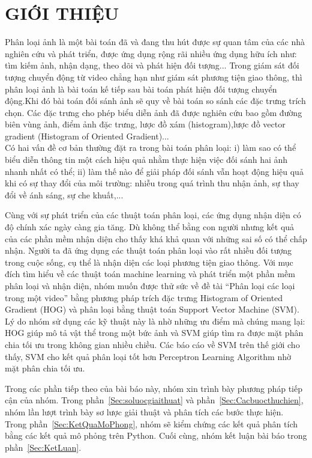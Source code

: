 \documentclass[10pt,conference,a4paper]{IEEEtran}
\begin{document}
\section{GIỚI THIỆU}
%
Phân loại ảnh là một bài toán đã và đang thu hút được sự quan tâm của các nhà nghiên cứu và phát triển, được ứng dụng rộng rãi nhiều ứng dụng hữu ích như: tìm kiếm ảnh, nhận dạng, theo dõi và phát hiện đối tượng... Trong giám sát đối tượng chuyển động từ video chẳng hạn như giám sát phương tiện giao thông, thì phân loại ảnh là bài toán kế tiếp sau bài toán phát hiện đối tượng chuyển động.Khi đó bài toán đối sánh ảnh sẽ quy về bài toán so sánh các đặc trưng trích chọn. Các đặc trưng cho phép biểu diễn ảnh đã được nghiên cứu bao gồm đường biên vùng ảnh, điểm ảnh đặc trưng, lược đồ xám (histogram),lược đồ vector gradient (Histogram of Oriented Gradient)... \\
Có hai vấn đề cơ bản thường đặt ra trong bài toán phân loại: i) làm sao có thể biểu diễn thông tin một cách hiệu quả nhằm thực hiện việc đối sánh hai ảnh nhanh nhất có thể; ii) làm thế nào để giải pháp đối sánh vẫn hoạt động hiệu quả khi có sự thay đổi của môi trường: nhiễu trong quá trình thu nhận ảnh, sự thay đổi về ánh sáng, sự che khuất,...


Cùng với sự phát triển của các thuật toán phân loại, các ứng dụng nhận diện có độ chính xác ngày càng gia tăng. Dù không thể bằng con người nhưng kết quả của các phần mềm nhận diện cho thấy khá khả quan với những sai số có thể chấp nhận. Người ta đã ứng dụng các thuật toán phân loại vào rất nhiều đối tượng trong cuộc sống, cụ thể là nhận diện các loại phương tiện giao thông. Với mục đích tìm hiểu về các thuật toán machine learning và phát triển một phần mềm phân loại và nhận diện, nhóm muốn được thử sức về đề tài “Phân loại các loại trong một video” bằng phương pháp trích đặc trưng Histogram of Oriented Gradient (HOG) và phân loại bằng thuật toán Support Vector Machine (SVM). Lý do nhóm sử dụng các kỹ thuật này là nhờ những ưu điểm mà chúng mang lại: HOG giúp mô tả vật thể trong một bức ảnh và SVM giúp tìm ra được mặt phân chia tối ưu trong không gian nhiều chiều. Các báo cáo về SVM trên thế giới cho thấy, SVM cho kết quả phân loại tốt hơn Perceptron Learning Algorithm nhờ mặt phân chia tối ưu. 



Trong các phần tiếp theo của bài báo này, nhóm xin trình bày phương pháp tiếp cận của nhóm. Trong phần~\ref{Sec:soluocgiaithuat} và phần~\ref{Sec:Cacbuocthuchien}, nhóm lần lượt trình bày sơ lược giải thuật và phân tích các bước thực hiện. Trong phần~\ref{Sec:KetQuaMoPhong}, nhóm sẽ kiểm chứng các kết quả phân tích bằng các kết quả mô phỏng trên Python. Cuối cùng, nhóm kết luận bài báo trong phần~\ref{Sec:KetLuan}.
%
\end{document}
